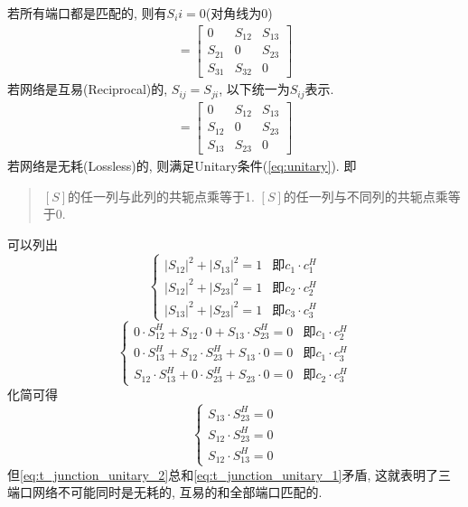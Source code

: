 \documentclass[a4paper]{report}
\begin{document}
若所有端口都是匹配的, 则有$S_ii=0$(对角线为0)
\begin{gather}
  [S]=\begin{bmatrix}
    0&S_{12}&S_{13}
    \\ S_{21}&0&S_{23}
    \\ S_{31}&S_{32}&0
  \end{bmatrix}
\end{gather}
若网络是互易(Reciprocal)的, $S_{ij}=S_{ji}$, 以下统一为$S_{ij}$表示. 
\begin{gather}
  [S]=\begin{bmatrix}
    0&S_{12}&S_{13}
    \\ S_{12}&0&S_{23}
    \\ S_{13}&S_{23}&0
  \end{bmatrix}
\end{gather}
若网络是无耗(Lossless)的, 则满足Unitary条件(\ref{eq:unitary}). 即
\begin{quotation}
  $[S]$的任一列与此列的共轭点乘等于1. $[S]$的任一列与不同列的共轭点乘等于0. 
\end{quotation}
可以列出
\begin{equation}
  \begin{cases}
    \lvert S_{12}\rvert ^2+\lvert S_{13}\rvert ^2=1 &\text{即}c_1\cdot c_1^H
    \\ \lvert S_{12}\rvert ^2+\lvert S_{23}\rvert ^2=1 &\text{即}c_2\cdot c_2^H
    \\ \lvert S_{13}\rvert ^2+\lvert S_{23}\rvert ^2=1 &\text{即}c_3\cdot c_3^H
  \end{cases}
    \label{eq:t_junction_unitary_1}
\end{equation}
\begin{equation}
  \begin{cases}
    0\cdot S_{12}^H+S_{12}\cdot 0+S_{13}\cdot S_{23}^H=0 &\text{即}c_1\cdot c_2^H
    \\ 0\cdot S_{13}^H+S_{12}\cdot S_{23}^H+S_{13}\cdot 0=0 &\text{即}c_1\cdot c_3^H
    \\ S_{12}\cdot S_{13}^H+0\cdot S_{23}^H+S_{23}\cdot 0=0 &\text{即}c_2\cdot c_3^H
  \end{cases}
\end{equation}
化简可得
\begin{equation}
  \begin{cases}
    S_{13}\cdot S_{23}^H=0
    \\ S_{12}\cdot S_{23}^H=0
    \\ S_{12}\cdot S_{13}^H=0
  \end{cases}
  \label{eq:t_junction_unitary_2}
\end{equation}
但\ref{eq:t_junction_unitary_2}总和\ref{eq:t_junction_unitary_1}矛盾, 这就表明了三端口网络不可能同时是无耗的, 互易的和全部端口匹配的. 
\end{document}
